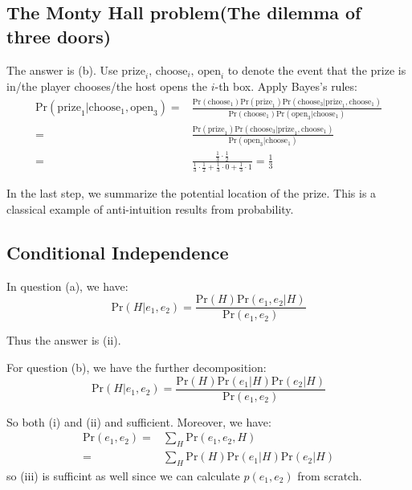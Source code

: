 \documentclass[UTF8]{ctexart}
\begin{document}
\subsection{The Monty Hall problem(The dilemma of three doors)}
The answer is (b).
Use $\text{prize}_{i}\text{, }\text{choose}_{i}\text{, }\text{open}_{i}$ to denote the event that the prize is in/the player chooses/the host opens the $i$-th box.
Apply Bayes's rules:
\begin{align}
\text{Pr}(\text{prize}_{1}|\text{choose}_{1},\text{open}_{3})=&\frac{\text{Pr}(\text{choose}_{1})\text{Pr}(\text{prize}_{1})\text{Pr}(\text{choose}_{3}|\text{prize}_{1},\text{choose}_{1})}{\text{Pr}(\text{choose}_{1})\text{Pr}(\text{open}_{3}|\text{choose}_{1})}\nonumber \\
=&\frac{\text{Pr}(\text{prize}_{1})\text{Pr}(\text{choose}_{3}|\text{prize}_{1},\text{choose}_{1})}{\text{Pr}(\text{open}_{3}|\text{choose}_{1})}\nonumber \\
=&\frac{\frac{1}{3}\cdot\frac{1}{2}}{\frac{1}{3}\cdot \frac{1}{2} + \frac{1}{3}\cdot 0 + \frac{1}{3} \cdot 1}=\frac{1}{3} \nonumber
\end{align}

In the last step, we summarize the potential location of the prize.
This is a classical example of anti-intuition results from probability.


\subsection{Conditional Independence}
In question (a), we have:
$$\text{Pr}(H|e_{1},e_{2})=\frac{\text{Pr}(H)\text{Pr}(e_{1},e_{2}|H)}{\text{Pr}(e_{1},e_{2})}$$

Thus the answer is (ii).

For question (b), we have the further decomposition:
$$\text{Pr}(H|e_{1},e_{2})=\frac{\text{Pr}(H)\text{Pr}(e_{1}|H)\text{Pr}(e_{2}|H)}{\text{Pr}(e_{1},e_{2})}$$

So both (i) and (ii) and sufficient.
Moreover, we have:
\begin{align}
\text{Pr}(e_{1},e_{2})=& \sum_{H}\text{Pr}(e_{1},e_{2},H) \nonumber \\
=&\sum_{H} \text{Pr}(H)\text{Pr}(e_{1}|H)\text{Pr}(e_{2}|H) \nonumber
\end{align}
so (iii) is sufficint as well since we can calculate $p(e_{1},e_{2})$ from scratch.
\end{document}
